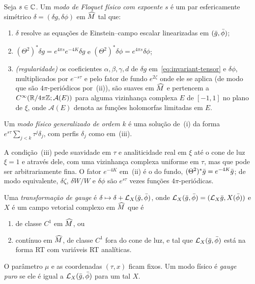 \begin{definition}\label{def:physical-mode}
Seja $s\in\mathbb{C}$. Um \emph{modo de Floquet físico com expoente $s$} é um par esfericamente simétrico
$\delta=(\delta g,\delta\phi)$ em $\widehat M$ tal que:
\begin{enumerate}[label=\textup{(\roman*)},leftmargin=*]
\item $\delta$ resolve as equações de Einstein--campo escalar linearizadas em $(\bar g,\bar\phi)$;
\item $(\Theta^2)^*\delta g=e^{4\pi s}e^{-4K}\delta g$ e $(\Theta^2)^*\delta\phi=e^{4\pi s}\delta\phi$;
\item \emph{(regularidade)} os coeficientes $\alpha,\beta,\gamma,d$ de $\delta g$ em~\eqref{eq:invariant-tensor}
  e $\delta\phi$, multiplicados por $e^{-s\tau}$ e pelo fator de fundo $e^{2\zeta}$ onde ele se aplica
  (de modo que são $4\pi$-periódicos por~(ii)), são suaves em $\widehat M$ e pertencem a $C^\infty(\mathbb{R}/4\pi\mathbb{Z};\mathcal A(E))$
  para alguma vizinhança complexa $E$ de $[-1,1]$ no plano de $\xi$, onde $\mathcal A(E)$ denota as funções
  holomorfas limitadas em $E$.
\end{enumerate}
Um \emph{modo físico generalizado de ordem $k$} é uma solução de~(i) da forma
$e^{s\tau}\sum_{j<k}\tau^j\delta_j$, com perfis $\delta_j$ como em~(iii).
\end{definition}

A condição~(iii) pede suavidade em $\tau$ e analiticidade real em $\xi$ até o cone de luz $\xi=1$ e através
dele, com uma vizinhança complexa uniforme em $\tau$, mas que pode ser arbitrariamente fina. O fator
$e^{-4K}$ em~(ii) é o do fundo, $(\Theta^2)^*\bar g=e^{-4K}\bar g$; de modo equivalente,
$\delta\zeta$, $\delta W/W$ e $\delta\phi$ são $e^{s\tau}$ vezes funções $4\pi$-periódicas.

\begin{definition}[Gauge]\label{def:gauge}
Uma \emph{transformação de gauge} é $\delta\mapsto\delta+\mathcal{L}_X(\bar g,\bar\phi)$, onde
$\mathcal{L}_X(\bar g,\bar\phi)=(\mathcal{L}_X\bar g,X(\bar\phi))$ e $X$ é um campo vetorial complexo em $\widehat M$ que é
\begin{enumerate}[label=\textup{(\alph*)},leftmargin=*]
\item de classe $C^1$ em $\widehat M$, ou
\item contínuo em $\widehat M$, de classe $C^1$ fora do cone de luz, e tal que $\mathcal{L}_X(\bar g,\bar\phi)$ está na
  forma RT com variáveis RT analíticas.
\end{enumerate}
O parâmetro $\mu$ e as coordenadas $(\tau,x)$ ficam fixos. Um modo físico é \emph{gauge puro}
se ele é igual a $\mathcal{L}_X(\bar g,\bar\phi)$ para um tal $X$.
\end{definition}

